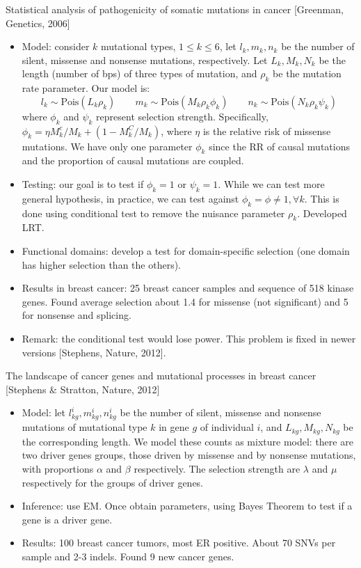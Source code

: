 \documentclass{report}
\begin{document}
Statistical analysis of pathogenicity of somatic mutations in cancer [Greenman, Genetics, 2006]
\begin{itemize}
	\item Model: consider $k$ mutational types, $1 \leq k \leq 6$, let $l_k, m_k, n_k$ be the number of silent, missense and nonsense mutations, respectively. Let $L_k, M_k, N_k$ be the length (number of bps) of three types of mutation, and $\rho_k$ be the mutation rate parameter. Our model is: 
	\begin{equation}
	l_k \sim \text{Pois}(L_k \rho_k) \qquad m_k \sim \text{Pois}(M_k \rho_k \phi_k) \qquad n_k \sim \text{Pois}(N_k \rho_k \psi_k)
	\end{equation}
	where $\phi_k$ and $\psi_k$ represent selection strength. Specifically, $\phi_k = \eta M_k^c/M_k + (1 - M_k^C/M_k)$, where $\eta$ is the relative risk of missense mutations. We have only one parameter $\phi_k$ since the RR of causal mutations and the proportion of causal mutations are coupled. 
	
	\item Testing: our goal is to test if $\phi_k = 1$ or $\psi_k = 1$. While we can test more general hypothesis, in practice, we can test against $\phi_k = \phi \neq 1, \forall k$. This is done using conditional test to remove the nuisance parameter $\rho_k$. Developed LRT.  
	
	\item Functional domains: develop a test for domain-specific selection (one domain has higher selection than the others). 
	
	\item Results in breast cancer: 25 breast cancer samples and sequence of 518 kinase genes. Found average selection about 1.4 for missense (not significant) and 5 for nonsense and splicing. 
	
	\item Remark: the conditional test would lose power. This problem is fixed in newer versions [Stephens, Nature, 2012]. 
\end{itemize}


The landscape of cancer genes and mutational processes in breast cancer [Stephens \& Stratton, Nature, 2012]
\begin{itemize}
	\item Model: let $l_{kg}^i, m_{kg}^i, n_{kg}^i$ be the number of silent, missense and nonsense mutations of mutational type $k$ in gene $g$ of individual $i$, and $L_{kg}, M_{kg}, N_{kg}$ be the corresponding length. We model these counts as mixture model: there are two driver genes groups, those driven by missense and by nonsense mutations, with proportions $\alpha$ and $\beta$ respectively. The selection strength are $\lambda$ and $\mu$ respectively for the groups of driver genes. 
	
	\item Inference: use EM. Once obtain parameters, using Bayes Theorem to test if a gene is a driver gene. 
	
	\item Results: 100 breast cancer tumors, most ER positive. About 70 SNVs per sample and 2-3 indels. Found 9 new cancer genes. 
\end{itemize}
\end{document}
